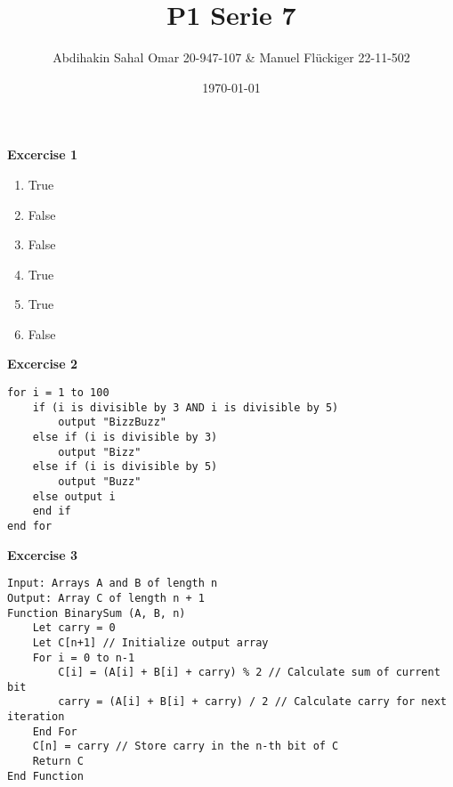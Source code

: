 \documentclass{article}
\author{Abdihakin Sahal Omar 20-947-107 & Manuel Flückiger 22-11-502}
\title{P1 Serie 7}
\date{\today}
\begin{document}
\maketitle

\textbf{Excercise 1}
\begin{enumerate}[label=\alph*]
    \item True
    \item False
    \item False
    \item True
    \item True
    \item False
\end{enumerate}

\textbf{Excercise 2}
\begin{verbatim}
for i = 1 to 100 
    if (i is divisible by 3 AND i is divisible by 5) 
        output "BizzBuzz" 
    else if (i is divisible by 3) 
        output "Bizz" 
    else if (i is divisible by 5) 
        output "Buzz" 
    else output i 
    end if 
end for
\end{verbatim}

\textbf{Excercise 3}
\begin{verbatim}
Input: Arrays A and B of length n 
Output: Array C of length n + 1 
Function BinarySum (A, B, n) 
    Let carry = 0 
    Let C[n+1] // Initialize output array 
    For i = 0 to n-1 
        C[i] = (A[i] + B[i] + carry) % 2 // Calculate sum of current bit 
        carry = (A[i] + B[i] + carry) / 2 // Calculate carry for next iteration 
    End For 
    C[n] = carry // Store carry in the n-th bit of C 
    Return C 
End Function
\end{verbatim}
\end{document}
